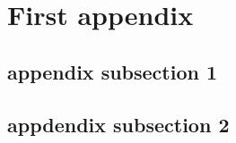 
\section{First appendix}
\label{sec:app_1}
  
\unskip





\subsection{appendix subsection 1}
\label{sec:appendix_subsection_1}
  


\subsection{appdendix subsection 2}
\label{sec:appendix_subsection_2}
  
